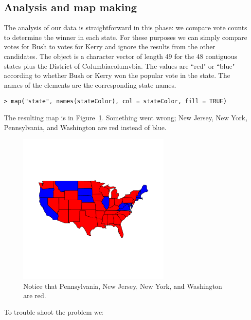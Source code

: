 \subsection{Analysis and map making}
The analysis of our data is straightforward in this phase:
we compare vote counts to determine the winner in each state.
For these purposes we can simply compare votes for Bush to votes for
Kerry and ignore the results from the other candidates.
The object  is a character vector of length 49
for the 48 contiguous states plus the District of Columbiacolumvbia.
The values are ``red" or ``blue" according to whether Bush or 
Kerry won the popular vote in the state. The names of the 
elements are the corresponding state names. 
\begin{verbatim}
> map("state", names(stateColor), col = stateColor, fill = TRUE)
\end{verbatim}
The resulting map is in Figure~\ref{fig:statemapwrong}. 
Something went wrong; New Jersey, New York, Pennsylvania, and 
Washington are red instead of blue.

\begin{figure}
\includegraphics[height=3in]{electionMaps/statemapwrong.pdf}
\caption{Notice that Pennsylvania, New Jersey, New York, and Washington are red.}
\label{fig:statemapwrong}
\end{figure} 

To trouble shoot the problem we:

